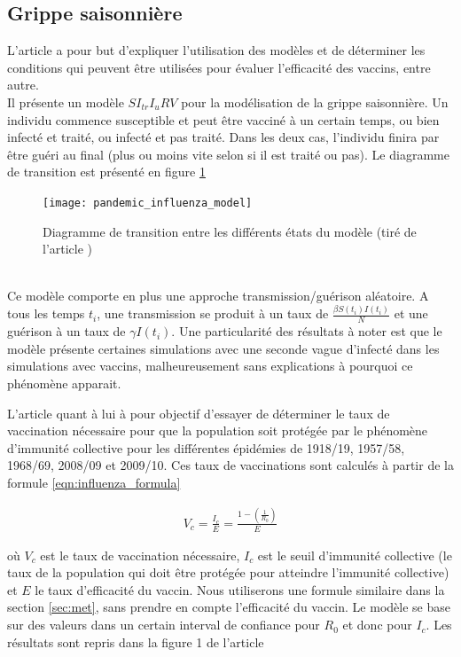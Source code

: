 \documentclass[journal, a4paper]{IEEEtran}
\begin{document}
	\subsection{Grippe saisonnière}
		L'article \cite{pandemic_influenza} a pour but d'expliquer l'utilisation des modèles et de déterminer les conditions qui peuvent être utilisées pour évaluer l'efficacité des vaccins, entre autre. \\
		Il présente un modèle $SI_{tr}I_uRV$ pour la modélisation de la grippe saisonnière. Un individu commence susceptible et peut être vacciné à un certain temps, ou bien infecté et traité, ou infecté et pas traité. Dans les deux cas, l'individu finira par être guéri au final (plus ou moins vite selon si il est traité ou pas). Le diagramme de transition est présenté en figure \ref{fig:pandemic_influenza_model}
		\begin{figure}[!hbt]
			\caption{Diagramme de transition entre les différents états du modèle (tiré de l'article \cite{pandemic_influenza})}
			\texttt{[image: pandemic\_influenza\_model]}
			\label{fig:pandemic_influenza_model}

		\end{figure} \\
		Ce modèle comporte en plus une approche transmission/guérison aléatoire. A tous les temps $t_i$, une transmission se produit à un taux de $\frac{\beta S(t_i)I(t_i)}{N}$ et une guérison à un taux de $\gamma I(t_i)$. Une particularité des résultats à noter est que le modèle présente certaines simulations avec une seconde vague d'infecté dans les simulations avec vaccins, malheureusement sans explications à pourquoi ce phénomène apparait.


		 L'article \cite{influenza_HIT} quant à lui à pour objectif d'essayer de déterminer le taux de vaccination nécessaire pour que la population soit protégée par le phénomène d'immunité collective pour les différentes épidémies de 1918/19, 1957/58, 1968/69, 2008/09 et 2009/10. Ces taux de vaccinations sont calculés à partir de la formule \ref{eqn:influenza_formula}

		 \begin{equation}
		 \label{eqn:influenza_formula}
		 	\begin{aligned}
		 		V_c = \frac{I_c}{E} = \frac{1-(\frac{1}{R_0})}{E}
		 	\end{aligned}
		 \end{equation}

		 où $V_c$ est le taux de vaccination nécessaire, $I_c$ est le seuil d'immunité collective (le taux de la population qui doit être protégée pour atteindre l'immunité collective) et $E$ le taux d'efficacité du vaccin. Nous utiliserons une formule similaire dans la section \ref{sec:met}, sans prendre en compte l'efficacité du vaccin. Le modèle se base sur des valeurs dans un certain interval de confiance pour $R_0$ et donc pour $I_c$. Les résultats sont repris dans la figure 1 de l'article \cite{influenza_HIT}
\end{document}

